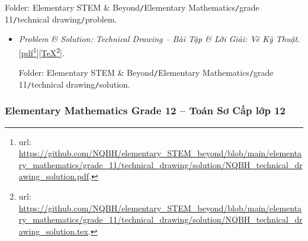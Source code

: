 \documentclass[12pt,twoside]{book}
\begin{document}
\begin{enumerate}
	Folder: {\sf Elementary STEM \& Beyond{\tt/}Elementary Mathematics{\tt/}grade 11{\tt/}technical drawing{\tt/}problem}.
	\begin{itemize}
		\item {\it Problem \& Solution: Technical Drawing -- Bài Tập \& Lời Giải: Vẽ Kỹ Thuật}. [\href{https://github.com/NQBH/elementary_STEM_beyond/blob/main/elementary_mathematics/grade_11/technical_drawing/solution/NQBH_technical_drawing_solution.pdf}{pdf}\footnote{{\sc url}: \url{https://github.com/NQBH/elementary_STEM_beyond/blob/main/elementary_mathematics/grade_11/technical_drawing/solution/NQBH_technical_drawing_solution.pdf}.}][\href{https://github.com/NQBH/elementary_STEM_beyond/blob/main/elementary_mathematics/grade_11/technical_drawing/solution/NQBH_technical_drawing_solution.tex}{\TeX}\footnote{{\sc url}: \url{https://github.com/NQBH/elementary_STEM_beyond/blob/main/elementary_mathematics/grade_11/technical_drawing/solution/NQBH_technical_drawing_solution.tex}.}].
		
		Folder: {\sf Elementary STEM \& Beyond{\tt/}Elementary Mathematics{\tt/}grade 11{\tt/}technical drawing{\tt/}solution}.
	\end{itemize}
\end{enumerate}

\subsubsection{Elementary Mathematics Grade 12 -- Toán Sơ Cấp lớp 12}
\end{document}
